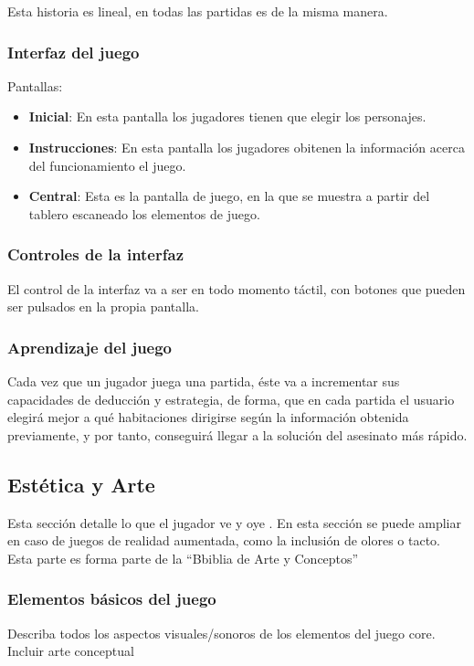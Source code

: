 Esta historia es lineal, en todas las partidas es de la misma manera.

\subsubsection{Interfaz del juego}
Pantallas:
\begin{itemize}
  \item \textbf{Inicial}: En esta pantalla los jugadores tienen que elegir los personajes.
  \item \textbf{Instrucciones}: En esta pantalla los jugadores obitenen la información acerca del funcionamiento el juego.
  \item \textbf{Central}: Esta es la pantalla de juego, en la que se muestra a partir del tablero escaneado los elementos de juego.
\end{itemize}

\subsubsection{Controles de la interfaz}
El control de la interfaz va a ser en todo momento táctil, con botones que pueden ser pulsados en la propia pantalla.

\subsubsection{Aprendizaje del juego}
Cada vez que un jugador juega una partida, éste va a incrementar sus capacidades de deducción y estrategia, de forma, que en cada partida el usuario elegirá mejor a qué habitaciones dirigirse según la información obtenida previamente, y por tanto, conseguirá llegar a la solución del asesinato más rápido.

\subsection{Estética y Arte}
Esta sección detalle lo que el jugador ve y oye . En esta sección se puede ampliar en caso de juegos de realidad aumentada, como la inclusión de olores o tacto. Esta parte es forma parte de la “Bbiblia de Arte y Conceptos”

\subsubsection{Elementos básicos del juego}
Describa todos los aspectos visuales/sonoros de los elementos del juego core. Incluir arte conceptual

